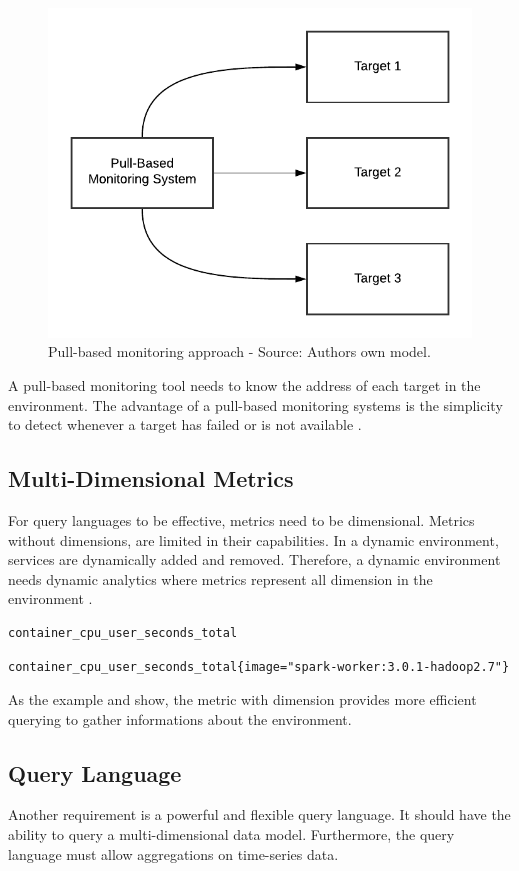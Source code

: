 \begin{figure}[h]
\centering
\includegraphics[scale=0.8]{images/02_theoretical_foundation/monitoring/pull_based}
\caption{Pull-based monitoring approach - Source: Authors own model.}
\label{fig:mon_pull-based}
\end{figure}
A pull-based monitoring tool needs to know the address of each target in the environment.
The advantage of a pull-based monitoring systems is the simplicity to detect whenever a target has failed or is not available \cite{Farcic2017Toolkit21}.


\subsection{Multi-Dimensional Metrics}
\label{subsec:02_monitoring_db_multi-metrics}
For query languages to be effective, metrics need to be dimensional. Metrics without dimensions, are limited in their capabilities.
In a dynamic environment, services are dynamically added and removed. Therefore, a dynamic environment needs dynamic analytics where metrics represent all dimension in the environment \cite{Farcic2018Toolkit22}.
\begin{lstlisting}[frame=single, label=lst:mon_metr_dimless, caption=Example of a dimensionless-metric, captionpos=b]
container_cpu_user_seconds_total
\end{lstlisting}
\begin{lstlisting}[frame=single, label=lst:mon_metr_withdim, caption=Example of a metric with dimensions, captionpos=b]
container_cpu_user_seconds_total{image="spark-worker:3.0.1-hadoop2.7"}
\end{lstlisting}
As the example  and  show, the metric with dimension provides more efficient querying to gather informations about the environment.


\subsection{Query Language}
Another requirement is a powerful and flexible query language. It should have the ability to query a multi-dimensional data model.
Furthermore, the query language must allow aggregations on time-series data.
